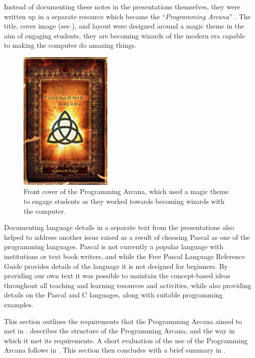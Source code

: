 Instead of documenting these notes in the presentations themselves, they were written up in a separate resource which became the ``\emph{Programming Arcana}'' \cite{Cain:2013arcana}. The title, cover image (see ), and layout were designed around a magic theme in the aim of engaging students, they are becoming wizards of the modern era capable to making the computer do amazing things.

\begin{figure}[htbp]
  \centering
  \includegraphics[width=0.4\textwidth]{front_cover_final}
  \caption{Front cover of the Programming Arcana, which used a magic theme to engage students as they worked towards becoming wizards with the computer.}
  \label{fig:front_cover_final}
\end{figure}

Documenting language details in a separate text from the presentations also helped to address another issue raised as a result of choosing Pascal as one of the programming languages. Pascal is not currently a popular language with institutions or text book writers, and while the Free Pascal Language Reference Guide \cite{FPC:2013lang} provides details of the language it is not designed for beginners. By providing our own text it was possible to maintain the concept-based ideas throughout all teaching and learning resources and activities, while also providing details on the Pascal and C languages, along with suitable programming examples.

This section outlines the requirements that the Programming Arcana aimed to met in .  describes the structure of the Programming Arcana, and the way in which it met its requirements. A short evaluation of the use of the Programming Arcana follows in . This section then concludes with a brief summary in .

